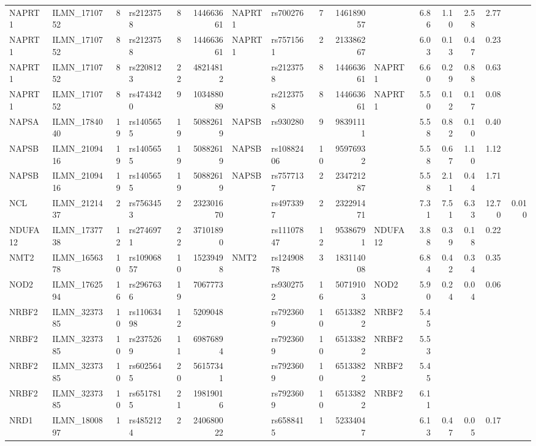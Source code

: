 \documentclass{article}
\begin{document}
\begin{landscape}
{\begin{ThreePartTable}
\begin{longtable}{|llr|lrrl|lrrl|rrrr|r|}
  NAPRT1 & ILMN\_1710752 & 8 & rs2123758 & 8 & 144663661 & NAPRT1 & rs700276 & 7 & 146189057 &  & 6.86 & 1.10 & 2.58 & 2.77 &  \\
  NAPRT1 & ILMN\_1710752 & 8 & rs2123758 & 8 & 144663661 & NAPRT1 & rs7571561 & 2 & 213386267 &  & 6.03 & 0.13 & 0.47 & 0.23 &  \\
  NAPRT1 & ILMN\_1710752 & 8 & rs2208123 & 22 & 48214812 &  & rs2123758 & 8 & 144663661 & NAPRT1 & 6.60 & 0.29 & 0.88 & 0.63 &  \\
  NAPRT1 & ILMN\_1710752 & 8 & rs4743420 & 9 & 103488089 &  & rs2123758 & 8 & 144663661 & NAPRT1 & 5.50 & 0.12 & 0.17 & 0.08 &  \\
  NAPSA & ILMN\_1784040 & 19 & rs1405655 & 19 & 50882619 & NAPSB & rs930280 & 9 & 98391111 &  & 5.58 & 0.82 & 0.10 & 0.40 &  \\
  NAPSB & ILMN\_2109416 & 19 & rs1405655 & 19 & 50882619 & NAPSB & rs10882406 & 10 & 95976932 &  & 5.58 & 0.67 & 1.10 & 1.12 &  \\
  NAPSB & ILMN\_2109416 & 19 & rs1405655 & 19 & 50882619 & NAPSB & rs7577137 & 2 & 234721287 &  & 5.58 & 2.11 & 0.44 & 1.71 &  \\
  NCL & ILMN\_2121437 & 2 & rs7563453 & 2 & 232301670 &  & rs4973397 & 2 & 232291471 &  & 7.31 & 7.51 & 6.33 & 12.70 & 0.010 \\
  NDUFA12 & ILMN\_1737738 & 12 & rs2746971 & 22 & 37101890 &  & rs11107847 & 12 & 95386791 & NDUFA12 & 3.88 & 0.39 & 0.18 & 0.22 &  \\
  NMT2 & ILMN\_1656378 & 10 & rs10906857 & 10 & 15239498 & NMT2 & rs12490878 & 3 & 183114008 &  & 6.84 & 0.42 & 0.34 & 0.35 &  \\
  NOD2 & ILMN\_1762594 & 16 & rs2967636 & 19 & 7067773 &  & rs9302752 & 16 & 50719103 & NOD2 & 5.90 & 0.24 & 0.04 & 0.06 &  \\
  NRBF2 & ILMN\_3237385 & 10 & rs11063498 & 12 & 5209048 &  & rs7923609 & 10 & 65133822 & NRBF2 & 5.45 &  &  &  &  \\
  NRBF2 & ILMN\_3237385 & 10 & rs2375269 & 11 & 69876894 &  & rs7923609 & 10 & 65133822 & NRBF2 & 5.53 &  &  &  &  \\
  NRBF2 & ILMN\_3237385 & 10 & rs6025645 & 20 & 56157341 &  & rs7923609 & 10 & 65133822 & NRBF2 & 5.45 &  &  &  &  \\
  NRBF2 & ILMN\_3237385 & 10 & rs6517815 & 21 & 19819016 &  & rs7923609 & 10 & 65133822 & NRBF2 & 6.11 &  &  &  &  \\
  NRD1 & ILMN\_1800897 & 1 & rs4852124 & 2 & 240680022 &  & rs6588415 & 1 & 52334047 &  & 6.13 & 0.47 & 0.05 & 0.17 &  \\

\end{longtable}
\end{ThreePartTable}}
\end{landscape}
\end{document}
